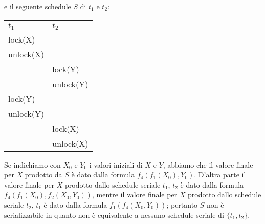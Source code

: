 e il seguente schedule $S$ di $t_1$ e $t_2$:
\begin{center}
 \begin{tabular}{|l|l|}
 \hline
 $t_1$ & $t_2$\\
 \hline
     lock(X)&\\
     unlock(X)&\\
     &lock(Y)\\
     &unlock(Y)\\
     lock(Y)&\\ 
     unlock(Y)&\\
     &lock(X)\\
     &unlock(X)\\
     \hline
    \end{tabular}
\end{center}
Se indichiamo con $X_0$ e $Y_0$ i valori iniziali di $X$ e $Y$, abbiamo che il valore finale per $X$ prodotto da $S$
è dato dalla formula $f_4(f_1(X_0), Y_0)$. D’altra parte il valore finale per $X$ prodotto dallo schedule
seriale $t_1$, $t_2$ è dato dalla formula $f_4(f_1(X_0), f_2(X_0, Y_0))$, mentre il valore finale per $X$ prodotto dallo
schedule seriale $t_2$, $t_1$ è dato dalla formula $f_1(f_4(X_0, Y_0))$; pertanto $S$ non è serializzabile in quanto
non è equivalente a nessuno schedule seriale di $\{t_1, t_2\}$. 